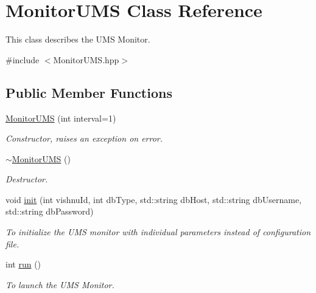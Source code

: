 \hypertarget{classMonitorUMS}{
\section{MonitorUMS Class Reference}
\label{classMonitorUMS}
}


This class describes the UMS Monitor.  




{\ttfamily \#include $<$MonitorUMS.hpp$>$}

\subsection*{Public Member Functions}
\begin{DoxyCompactItemize}
\item 
\hyperlink{classMonitorUMS_ab3e7af32b9eb1e778ade65438d52fd8b}{MonitorUMS} (int interval=1)
\begin{DoxyCompactList}\small\item\em Constructor, raises an exception on error. \item\end{DoxyCompactList}\item 
\hypertarget{classMonitorUMS_a4dd94f7d4a5cfafb4c668cde6f231e3e}{
\hyperlink{classMonitorUMS_a4dd94f7d4a5cfafb4c668cde6f231e3e}{$\sim$MonitorUMS} ()}
\label{classMonitorUMS_a4dd94f7d4a5cfafb4c668cde6f231e3e}

\begin{DoxyCompactList}\small\item\em Destructor. \item\end{DoxyCompactList}\item 
void \hyperlink{classMonitorUMS_aab02ba843105bb0abcfe34fa12ecaa59}{init} (int vishnuId, int dbType, std::string dbHost, std::string dbUsername, std::string dbPassword)
\begin{DoxyCompactList}\small\item\em To initialize the UMS monitor with individual parameters instead of configuration file. \item\end{DoxyCompactList}\item 
int \hyperlink{classMonitorUMS_aa4e9d26960b0519c7bfd4e470d1fc0a7}{run} ()
\begin{DoxyCompactList}\small\item\em To launch the UMS Monitor. \item\end{DoxyCompactList}\end{DoxyCompactItemize}
